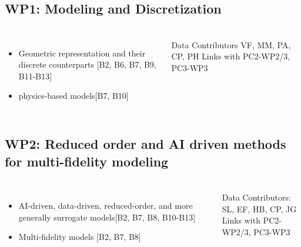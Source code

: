 \subsection{WP1: Modeling and Discretization}
\begin{frame}
  \frametitle{\insertsectionhead}
  \framesubtitle{\insertsubsectionhead}

  \begin{columns}
    \begin{itemize}
      \item Geometric representation and their discrete counterparts [B2, B6, B7, B9, B11-B13] 
      \item physics-based models[B7, B10] 
    \end{itemize}
  
  \begin{alertblock}{Data }
    Contributors VF, MM, PA, CP, PH
    Links with PC2-WP2/3, PC3-WP3 

  \end{alertblock}

  \end{columns}
\end{frame}


\subsection{WP2: Reduced order and AI driven methods for multi-fidelity modeling} 
\begin{frame}
  \frametitle{\insertsectionhead}
  \framesubtitle{\insertsubsectionhead}

  \begin{columns}
    \begin{itemize}
      \item AI-driven, data-driven, reduced-order, and more generally surrogate models[B2, B7, B8, B10-B13]
      \item Multi-fidelity models [B2, B7, B8]
    \end{itemize}
  
    \begin{alertblock}{Data}
    Contributors: SL, EF, HB, CP, JG\\
    Links with PC2-WP2/3, PC3-WP3
  \end{alertblock}

  \end{columns}
\end{frame}

